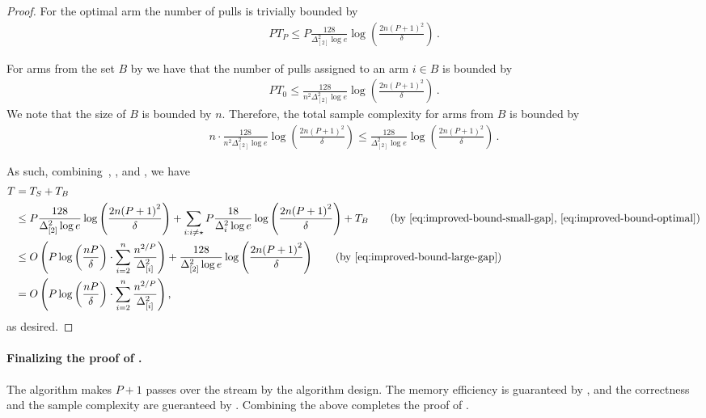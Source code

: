 \begin{proof}
	For the optimal arm the number of pulls is trivially bounded by \begin{align}\label{eq:improved-bound-optimal}
		P T_{P} \le P \frac{128}{\Delta_{[2]}^2 \log e} \log\left(\frac{2n{(P + 1)}^2}{\delta}\right)\,.
	\end{align}
	
	For arms from the set \(B\) by  we have that the number of pulls assigned to an arm \(i \in B\) is bounded by 
	\begin{align*}
		P T_0 \le \frac{128}{n^2\Delta_{[2]}^2 \log e} \log \left(\frac{2n{(P + 1)}^2}{\delta}\right)\,.
	\end{align*}
	We note that the size of \(B\) is bounded by \(n\). Therefore, the total sample complexity for arms from \(B\) is bounded by 
	\begin{align}\label{eq:improved-bound-large-gap}
		n \cdot \frac{128}{n^2\Delta_{[2]}^2 \log e} \log \left(\frac{2n{(P + 1)}^2}{\delta}\right) \le \frac{128}{\Delta_{[2]}^2 \log e} \log \left(\frac{2n{(P + 1)}^2}{\delta}\right)\,.
	\end{align}
	
	As such, combining~, , and , we have
	\begin{align*}
		T &= T_{S} + T_{B}\\
		&\leq P \frac{128}{\Delta_{[2]}^2 \log e} \log\left(\frac{2n{(P + 1)}^2}{\delta}\right) + \sum_{i: i\neq \star} P \frac{18}{\Delta_{i}^2 \log e} \log\left(\frac{2n{(P + 1)}^2}{\delta}\right) + T_{B}\tag{by \Cref{eq:improved-bound-small-gap}, \Cref{eq:improved-bound-optimal}}\\
		&\leq O\left(P \log\left( \frac{nP}{\delta}\right) \cdot \sum_{i = 2}^n \frac{n^{2/P}}{\Delta^2_{[i]}}\right) + \frac{128}{\Delta_{[2]}^2 \log e} \log \left(\frac{2n{(P + 1)}^2}{\delta}\right)  \tag{by \Cref{eq:improved-bound-large-gap}}\\
		&= O\left(P \log\left( \frac{nP}{\delta}\right) \cdot \sum_{i = 2}^n \frac{n^{2/P}}{\Delta^2_{[i]}}\right),
	\end{align*} 
	as desired.
\end{proof}

\paragraph{Finalizing the proof of .} The algorithm makes $P+1$ passes over the stream by the algorithm design. The memory efficiency is guaranteed by , and the correctness and the sample complexity are gueranteed by . Combining the above completes the proof of .

